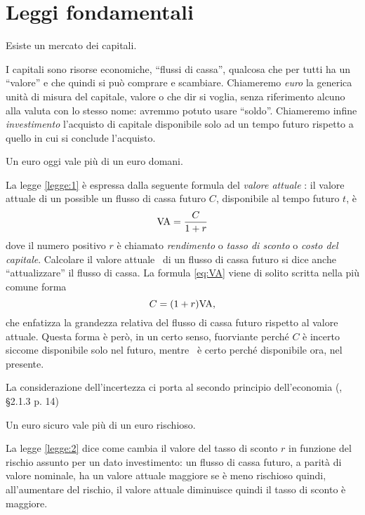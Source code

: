 
\chapter{Leggi fondamentali}
\label{chap:Leggi_fondamentali}

\begin{legge}\label{law:0}
  Esiste un mercato dei capitali.
\end{legge}
I capitali sono risorse economiche, ``flussi di cassa'', qualcosa che per tutti ha un ``valore''
e che quindi si può comprare e scambiare. Chiameremo \emph{euro} la generica unità di misura del
capitale, valore o che dir si voglia, senza riferimento alcuno alla valuta con lo stesso nome:
avremmo potuto usare ``soldo''. Chiameremo infine \emph{investimento} l'acquisto di capitale
disponibile solo ad un tempo futuro rispetto a quello in cui si conclude l'acquisto.

\begin{legge}\label{legge:1}
  Un euro oggi vale più di un euro domani.
\end{legge}
La legge \ref{legge:1} è espressa dalla seguente formula del \emph{valore attuale}
\VA: il valore attuale di un possible un flusso di cassa futuro $C$, disponibile
al tempo futuro $t$, è
\begin{equation}
  \label{eq:VA}
  \mathrm{VA}=\frac{C}{1+r}
\end{equation}
dove il numero positivo $r$ è chiamato \emph{rendimento} o \emph{tasso di sconto} o
\emph{costo del capitale}. Calcolare il valore attuale \VA\ di un flusso di cassa futuro
si dice anche ``attualizzare'' il flusso di cassa.
La formula \eqref{eq:VA} viene di solito scritta nella più comune forma 
\[
  C=(1+r)\mathrm{VA},
\]
che enfatizza la grandezza relativa del flusso di cassa futuro rispetto al valore attuale.
Questa forma è però, in un certo senso, fuorviante perché $C$ è incerto siccome disponibile
solo nel futuro, mentre \VA\ è certo perché disponibile ora, nel presente.

La considerazione dell'incertezza ci porta al secondo
principio dell'economia (\cite{brealey_et_al1999}, §2.1.3 p. 14)

\begin{legge}\label{legge:2}
  Un euro sicuro vale più di un euro rischioso.  
\end{legge}
La legge \ref{legge:2} dice come cambia il valore del tasso di sconto $r$ in funzione del
rischio assunto per un dato investimento: un flusso di cassa futuro, a parità di valore nominale,
ha un valore attuale maggiore se è meno rischioso quindi, all'aumentare del rischio, il valore attuale
diminuisce quindi il tasso di sconto è maggiore.


